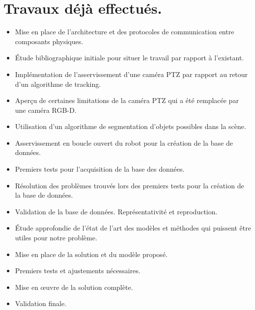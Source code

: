 \section{Travaux déjà effectués.}
\begin{itemize}
    \item[\checkmark] Mise en place de l'architecture et des protocoles de communication entre composants physiques.
    \item[\checkmark] Étude bibliographique initiale pour situer le travail par rapport à l'existant.
    \item[\checkmark] Implémentation de l'asservissement d'une caméra PTZ par rapport au retour d'un algorithme de tracking.
    \item[\checkmark] Aperçu de certaines limitations de la caméra PTZ qui a été remplacée par une caméra RGB-D.
    \item[\checkmark] Utilisation d'un algorithme de segmentation d'objets possibles dans la scène.
    \item[\checkmark] Asservissement en boucle ouvert du robot pour la création de la base de données.
    \item[\checkmark] Premiers tests pour l'acquisition de la base des données.
    \item Résolution des problèmes trouvés lors des premiers tests pour la création de la base de données.
    \item Validation de la base de données. Représentativité et reproduction.
    \item Étude approfondie de l’état de l'art des modèles et méthodes qui puissent être utiles pour notre problème.
    \item Mise en place de la solution et du modèle proposé.
    \item Premiers tests et ajustements nécessaires.
    \item Mise en œuvre de la solution complète.
    \item Validation finale.    
\end{itemize}
